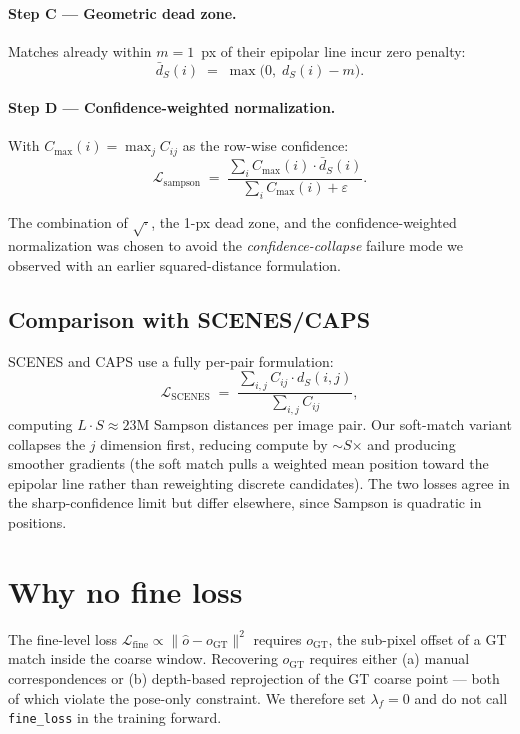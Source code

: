 \documentclass[11pt]{article}
\begin{document}
\paragraph{Step C --- Geometric dead zone.} Matches already within
$m = 1$~px of their epipolar line incur zero penalty:
\begin{equation}
\bar d_S(i) \;=\; \max\!\bigl(0,\; d_S(i) - m\bigr).
\end{equation}

\paragraph{Step D --- Confidence-weighted normalization.} With
$C_{\max}(i) = \max_j C_{ij}$ as the row-wise confidence:
\begin{equation}
\mathcal{L}_{\text{sampson}}
\;=\;
\frac{\sum_i C_{\max}(i)\cdot \bar d_S(i)}
     {\sum_i C_{\max}(i) + \varepsilon}.
\end{equation}

The combination of $\sqrt{\cdot}$, the 1-px dead zone, and the
confidence-weighted normalization was chosen to avoid the
\emph{confidence-collapse} failure mode we observed with an earlier
squared-distance formulation.

\subsection{Comparison with SCENES/CAPS}

SCENES and CAPS use a fully per-pair formulation:
\begin{equation}
\mathcal{L}_{\text{SCENES}}
\;=\;
\frac{\sum_{i,j} C_{ij}\cdot d_S(i,j)}{\sum_{i,j} C_{ij}},
\end{equation}
computing $L \cdot S \approx 23$M Sampson distances per image pair. Our
soft-match variant collapses the $j$ dimension first, reducing compute
by $\sim$$S$$\times$ and producing smoother gradients (the soft match
pulls a weighted mean position toward the epipolar line rather than
reweighting discrete candidates). The two losses agree in the
sharp-confidence limit but differ elsewhere, since Sampson is quadratic
in positions.

\section{Why no fine loss}

The fine-level loss
$\mathcal{L}_{\text{fine}} \propto \|\hat o - o_{\text{GT}}\|^2$
requires $o_{\text{GT}}$, the sub-pixel offset of a GT match inside the
coarse window. Recovering $o_{\text{GT}}$ requires either (a) manual
correspondences or (b) depth-based reprojection of the GT coarse point
--- both of which violate the pose-only constraint. We therefore set
$\lambda_f = 0$ and do not call \texttt{fine\_loss} in the training
forward.
\end{document}
